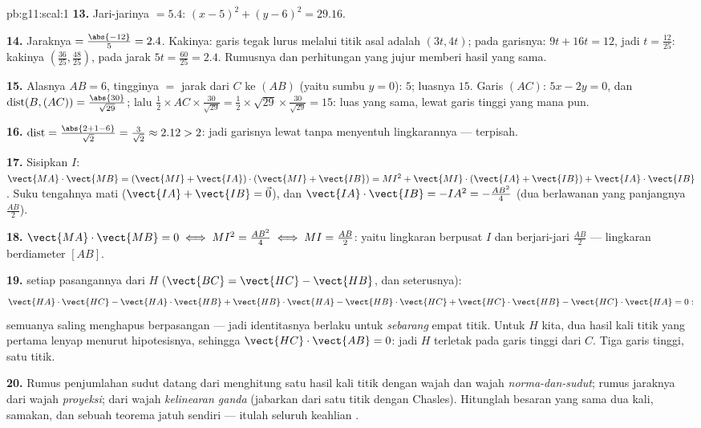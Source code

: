 \begin{solution}{pb:g11:scal:1}
\textbf{13.} Jari-jarinya $= 5.4$:
$(x - 5)^2 + (y - 6)^2 = 29.16$.

\textbf{14.} Jaraknya $= \frac{\abs{-12}}{5} = 2.4$. Kakinya: garis
tegak lurus melalui titik asal adalah $(3t, 4t)$; pada garisnya:
$9t + 16t = 12$, jadi $t = \frac{12}{25}$: kakinya
$\left(\frac{36}{25}, \frac{48}{25}\right)$, pada jarak
$5t = \frac{60}{25} = 2.4$. Rumusnya dan perhitungan yang jujur
memberi hasil yang sama.

\textbf{15.} Alasnya $AB = 6$, tingginya $=$ jarak dari $C$ ke
$(AB)$ (yaitu sumbu $y = 0$): $5$; luasnya $15$. Garis $(AC)$:
$5x - 2y = 0$, dan
$\operatorname{dist}(B, (AC)) = \frac{\abs{30}}{\sqrt{29}}$;
lalu $\frac12 \times AC \times \frac{30}{\sqrt{29}} =
\frac12 \times \sqrt{29} \times \frac{30}{\sqrt{29}} = 15$:
luas yang sama, lewat garis tinggi yang mana pun.

\textbf{16.} $\operatorname{dist} = \frac{\abs{2 + 1 - 6}}
{\sqrt2} = \frac{3}{\sqrt2} \approx 2.12 > 2$: jadi garisnya lewat
tanpa menyentuh lingkarannya --- terpisah.

\textbf{17.} Sisipkan $I$:
$\vect{MA} \cdot \vect{MB} = (\vect{MI} + \vect{IA}) \cdot
(\vect{MI} + \vect{IB}) = MI^2 + \vect{MI} \cdot (\vect{IA} +
\vect{IB}) + \vect{IA} \cdot \vect{IB}$. Suku tengahnya mati
($\vect{IA} + \vect{IB} = \vec 0$), dan
$\vect{IA} \cdot \vect{IB} = -IA^2 = -\frac{AB^2}{4}$
(dua  berlawanan yang panjangnya $\frac{AB}2$).

\textbf{18.} $\vect{MA} \cdot \vect{MB} = 0 \iff MI^2 =
\frac{AB^2}{4} \iff MI = \frac{AB}{2}$: yaitu lingkaran berpusat
$I$ dan berjari-jari $\frac{AB}2$ --- lingkaran berdiameter
$[AB]$.

\textbf{19.}  setiap pasangannya dari $H$ ($\vect{BC} =
\vect{HC} - \vect{HB}$, dan seterusnya):
\[
\vect{HA} \cdot \vect{HC} - \vect{HA} \cdot \vect{HB}
+ \vect{HB} \cdot \vect{HA} - \vect{HB} \cdot \vect{HC}
+ \vect{HC} \cdot \vect{HB} - \vect{HC} \cdot \vect{HA} = 0 :
\]
semuanya saling menghapus berpasangan --- jadi identitasnya berlaku untuk
\emph{sebarang} empat titik. Untuk $H$ kita, dua hasil kali titik yang
pertama lenyap menurut hipotesisnya, sehingga
$\vect{HC} \cdot \vect{AB} = 0$: jadi $H$ terletak pada garis tinggi dari
$C$. Tiga garis tinggi, satu titik.

\textbf{20.} Rumus penjumlahan sudut datang dari menghitung satu hasil kali
titik dengan wajah \emph{} dan wajah
\emph{norma-dan-sudut}; rumus jaraknya dari wajah
\emph{proyeksi};  dari wajah
\emph{kelinearan ganda} (jabarkan dari satu titik dengan Chasles). Hitunglah
besaran yang sama dua kali, samakan, dan sebuah teorema jatuh sendiri --- itulah
seluruh keahlian .

\end{solution}
